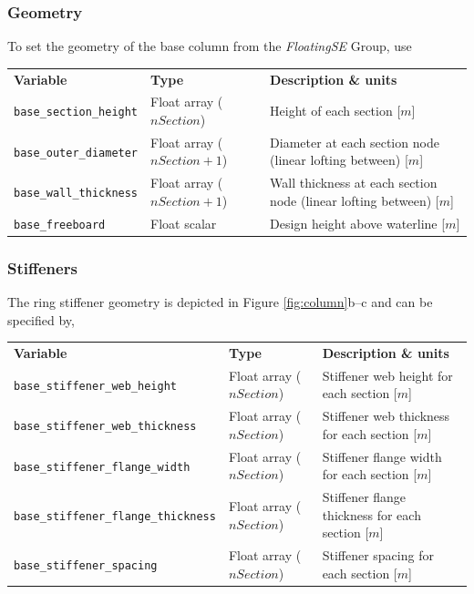 \subsubsection{Geometry}
To set the geometry of the base column from the \textit{FloatingSE} Group, use

{\footnotesize
  \begin{tabularx}{\linewidth}{ l l X }
    \textbf{Variable} & \textbf{Type} & \textbf{Description \& units} \\
    \texttt{base\_section\_height} & Float array ($nSection$) & Height of each section [$m$]\\
    \texttt{base\_outer\_diameter} & Float array ($nSection+1$) & Diameter at each section node (linear lofting between) [$m$] \\
    \texttt{base\_wall\_thickness} & Float array ($nSection+1$) & Wall thickness at each section node (linear lofting between) [$m$] \\
    \texttt{base\_freeboard} & Float scalar & Design height above waterline [$m$]\\
  \end{tabularx}
}

\subsubsection{Stiffeners}
The ring stiffener geometry is depicted in Figure \ref{fig:column}b--c and can be specified by,

{\footnotesize
  \begin{tabularx}{\linewidth}{ l l X }
    \textbf{Variable} & \textbf{Type} & \textbf{Description \& units} \\
    \texttt{base\_stiffener\_web\_height} & Float array ($nSection$) & Stiffener web height for each section [$m$]\\
    \texttt{base\_stiffener\_web\_thickness} & Float array ($nSection$) & Stiffener web thickness for each section [$m$]\\
    \texttt{base\_stiffener\_flange\_width} & Float array ($nSection$) & Stiffener flange width for each section [$m$]\\
    \texttt{base\_stiffener\_flange\_thickness} & Float array ($nSection$) & Stiffener flange thickness for each section [$m$]\\
    \texttt{base\_stiffener\_spacing} & Float array ($nSection$) & Stiffener spacing for each section [$m$]\\
  \end{tabularx}
}

